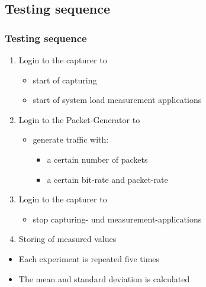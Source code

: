\subsection*{Testing sequence}
\begin{frame}
\frametitle{Testing sequence}
\begin{enumerate}
	\item Login to the capturer to 
		\begin{itemize}
			\item start of capturing 
			\item start of system load measurement applications 
		\end{itemize}
	\item Login to the Packet-Generator to 

	\begin{itemize}
		\item generate traffic with:
				\begin{itemize}
					\item a certain number of packets
					\item a certain bit-rate and packet-rate
				\end{itemize}
	\end{itemize}

	\item Login to the capturer to 
		\begin{itemize}
			\item stop capturing- und measurement-applications
		\end{itemize}
	\item Storing of measured values
\end{enumerate}
\begin{itemize}
	\item Each experiment is repeated five times
	\item The mean and standard deviation is calculated
\end{itemize}
\end{frame}

